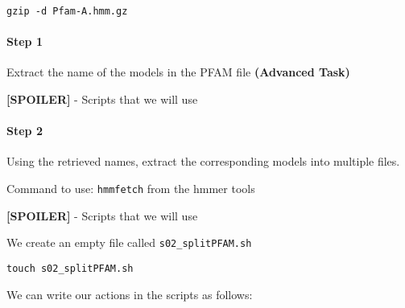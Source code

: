 \documentclass[
]{book}
\newenvironment{Shaded}{\begin{snugshade}}{\end{snugshade}}
\newcommand{\BuiltInTok}[1]{#1}
\newcommand{\CommentTok}[1]{\textcolor[rgb]{0.56,0.35,0.01}{\textit{#1}}}
\newcommand{\ControlFlowTok}[1]{\textcolor[rgb]{0.13,0.29,0.53}{\textbf{#1}}}
\newcommand{\ExtensionTok}[1]{#1}
\newcommand{\FunctionTok}[1]{\textcolor[rgb]{0.13,0.29,0.53}{\textbf{#1}}}
\newcommand{\KeywordTok}[1]{\textcolor[rgb]{0.13,0.29,0.53}{\textbf{#1}}}
\newcommand{\NormalTok}[1]{#1}
\newcommand{\OperatorTok}[1]{\textcolor[rgb]{0.81,0.36,0.00}{\textbf{#1}}}
\newcommand{\StringTok}[1]{\textcolor[rgb]{0.31,0.60,0.02}{#1}}
\newcommand{\VariableTok}[1]{\textcolor[rgb]{0.00,0.00,0.00}{#1}}
\begin{document}
\texttt{gzip\ -d\ Pfam-A.hmm.gz}

\paragraph*{\texorpdfstring{\textbf{Step 1}}{Step 1}}\label{step-1}

Extract the name of the models in the PFAM file \textbf{(Advanced Task)}

\textbf{{[}SPOILER{]}} - Scripts that we will use

\begin{Shaded}
\end{Shaded}

\paragraph*{\texorpdfstring{\textbf{Step 2}}{Step 2}}\label{step-2}

Using the retrieved names, extract the corresponding models into multiple files.

Command to use: \texttt{hmmfetch} from the hmmer tools

\textbf{{[}SPOILER{]}} - Scripts that we will use

We create an empty file called \texttt{s02\_splitPFAM.sh}

\texttt{touch\ s02\_splitPFAM.sh}

We can write our actions in the scripts as follows:

\begin{Shaded}
\end{Shaded}
\end{document}
